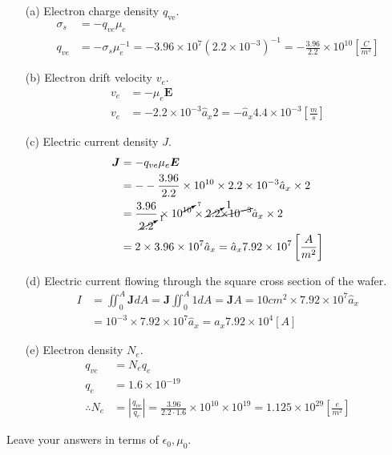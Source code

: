 \documentclass[12pt]{article}
\begin{document}
\begin{itemize}
\item[(a)] Electron charge density \( q_{\text{ve}} \).
   \begin{align*}
    \sigma_s &= -q_{ve}\mu_e\\
    q_{ve} &= -\sigma_s\mu_e^{-1} = -3.96 \times 10^7(2.2 \times 10^{-3})^{-1} = -\frac{3.96}{2.2}\times 10^{10} \left[\frac{C}{m^3}\right] 
  \end{align*}
 
\item[(b)] Electron drift velocity \( v_e \).
  \begin{align*}
    v_e &= -\mu_e\bm{E}\\
    v_e &= -2.2 \times 10^{-3}\hat{a}_x 2 = -\hat{a}_x 4.4\times 10^{-3}  \left[\frac{m}{s}\right]
  \end{align*}
\item[(c)] Electric current density \( J \).
  \begin{align*}
    \bm{J} &= -q_{ve}\mu_e\bm{E}\\
           &= --\frac{3.96}{2.2}\times 10^{10}\times 2.2 \times 10^{-3} \hat{a}_x \times 2 \\
           &= \frac{3.96}{\cancelto{1}{2.2}}\times 10^{\cancelto{7}{10}}\times \cancelto{1}{2.2} \cancel{\times 10^{-3}} \hat{a}_x \times 2\\
   &= 2\times3.96\times 10^7\hat{a}_x = \hat{a}_x 7.92 \times 10^7  \left[\frac{A}{m^2}\right]
  \end{align*}
\item[(d)] Electric current flowing through the square cross section of the wafer.
  \begin{align*}
    I &= \iint_{0}^{A}\bm{J}dA = \bm{J}\iint_{0}^{A}1dA = \bm{J}A = 10cm^2 \times 7.92\times 10^7\hat{a}_x\\
    &= 10^{-3} \times 7.92\times 10^7\hat{a}_x = \hat{a}_x 7.92\times 10^4[A]
  \end{align*}
\item[(e)] Electron density \( N_e \).
  \begin{align*}
    q_{ve} &= N_eq_e\\
    q_e &= 1.6\times 10^{-19}\\
    \therefore N_e &= \left|\frac{q_{ve}}{q_{e}}\right| = \frac{3.96}{2.2 \cdot 1.6}\times 10^{10} \times 10^{19} = 1.125 \times 10^{29}\left[\frac{e}{m^2}\right]
  \end{align*}
\end{itemize}
Leave your answers in terms of \( \epsilon_0, \mu_0 \).




\end{document}
